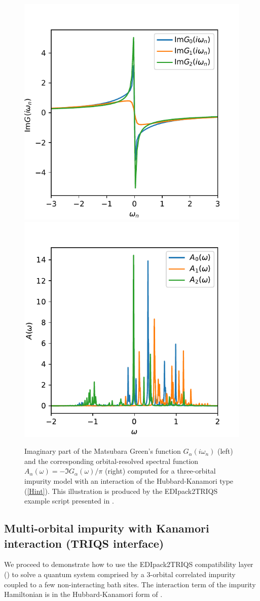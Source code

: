 \documentclass[edipack_sp.tex]{subfiles}
\begin{document}
\begin{figure}[t!]
    \includegraphics[width=0.5\linewidth]
        {figures/G_iw.pdf}
    \includegraphics[width=0.5\linewidth]
        {figures/A_w.pdf}
    \caption{\label{figEx3}%
        Imaginary part of the Matsubara Green's function $G_\alpha(i\omega_n)$ (left) and the
        corresponding orbital-resolved spectral function $A_\alpha(\omega) = -\Im{G_\alpha(\omega)} / \pi$ (right) computed for a
        three-orbital impurity model with an interaction of the Hubbard-Kanamori
        type (\ref{Hint}). This illustration is produced by the EDIpack2TRIQS
        example script presented in .
    }
\end{figure}

\subsection{Multi-orbital impurity with Kanamori
  interaction (TRIQS interface)}
\label{SecExamplesTRIQS}

We proceed to demonstrate how to use the EDIpack2TRIQS compatibility
layer () to solve a quantum system comprised by a
3-orbital correlated impurity coupled to a few non-interacting bath sites.
The interaction term of the impurity Hamiltonian is in the Hubbard-Kanamori
form of .
\end{document}
